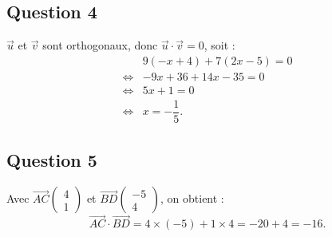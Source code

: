 \subsection*{Question 4}

\(\vec{u}\) et \(\vec{v}\) sont orthogonaux, donc \(\vec{u} \cdot \vec{v} = 0\), soit :
\begin{align*}
&9(-x + 4) + 7(2x - 5) = 0 \\
\iff &-9x + 36 + 14x - 35 = 0 \\
\iff &5x + 1 = 0 \\
\iff &x = -\dfrac{1}{5}.
\end{align*}

\subsection*{Question 5}

Avec \(\overrightarrow{AC} \begin{pmatrix} 4 \\ 1 \end{pmatrix}\) et \(\overrightarrow{BD} \begin{pmatrix} -5 \\ 4 \end{pmatrix}\), on obtient :
\[
\overrightarrow{AC} \cdot \overrightarrow{BD} = 4 \times (-5) + 1 \times 4 = -20 + 4 = -16.
\]
